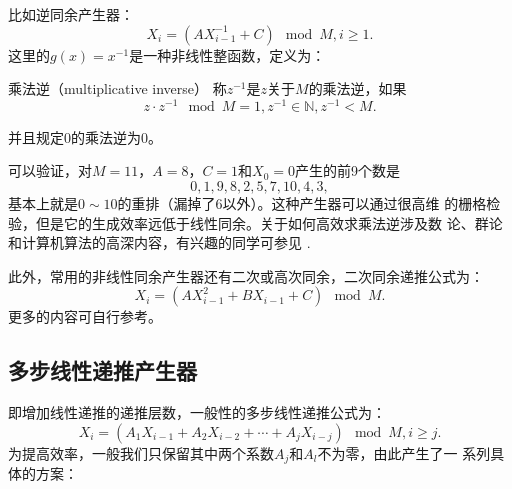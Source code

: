 比如逆同余产生器：
\begin{equation}
  X_i = (A X_{i - 1}^{-1} + C) \mod M, i \geq 1.
  \label{eq::inv_lin}
\end{equation}
这里的$g(x) = x^{-1}$是一种非线性整函数，定义为：

\begin{definition} {\hei 乘法逆（multiplicative inverse）}
  称$z^{-1}$是$z$关于$M$的乘法逆，如果
  \begin{equation}
    z \cdot z^{-1} \mod M = 1, z^{-1} \in \mathbb{N}, z^{-1} < M.
    \label{eq::mul_inv}
  \end{equation}
  \label{def::mul_inv}
\end{definition}
并且规定$0$的乘法逆为$0$。

可以验证，对$M = 11$，$A = 8$，$C = 1$和$X_0 = 0$产生的前9个数是
$$
0, 1, 9, 8, 2, 5, 7, 10, 4, 3,
$$基本上就是$0 \sim 10$的重排（漏掉了6以外）。这种产生器可以通过很高维
的栅格检验，但是它的生成效率远低于线性同余。关于如何高效求乘法逆涉及数
论、群论和计算机算法的高深内容，有兴趣的同学可参见
\cite{Lidl1986Introduction}.

此外，常用的非线性同余产生器还有二次或高次同余，二次同余递推公式为：
\begin{equation}
  X_i = (A X_{i - 1}^2 + B X_{i - 1} + C) \mod M.
  \label{eq::q_mod}
\end{equation}
更多的内容可自行参考\cite{Fishman1995Monte, Kang2015MonteCarlo}。

\subsection{多步线性递推产生器}
即增加线性递推的递推层数，一般性的多步线性递推公式为：
\begin{equation}
  X_i = (A_1 X_{i - 1} + A_2 X_{i - 2} + \cdots + A_j X_{i - j}) \mod
  M, i \geq j.
  \label{eq::mul_lin}
\end{equation}
为提高效率，一般我们只保留其中两个系数$A_j$和$A_l$不为零，由此产生了一
系列具体的方案：

